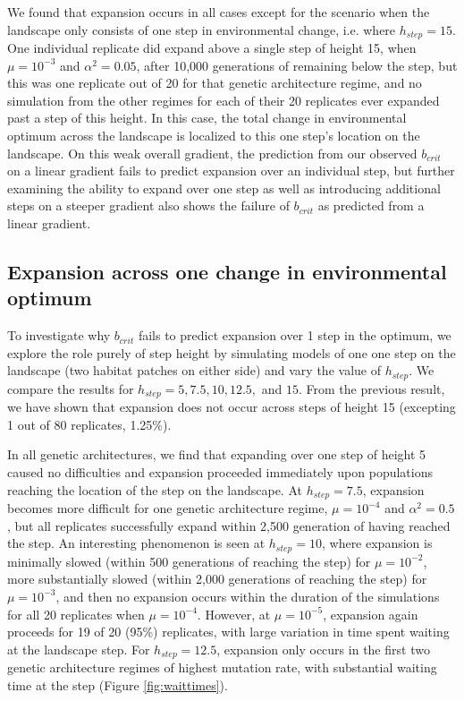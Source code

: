 We found that expansion occurs in all cases except for the scenario when the landscape only consists of one step in environmental change, i.e. where $h_{step} = 15$. One individual replicate did expand above a single step of height 15, when $\mu = 10^{-3}$ and $\alpha^2 = 0.05$, after 10,000 generations of remaining below the step, but this was one replicate out of 20 for that genetic architecture regime, and no simulation from the other regimes for each of their 20 replicates ever expanded past a step of this height. In this case, the total change in environmental optimum across the landscape is localized to this one step's location on the landscape. On this weak overall gradient, the prediction from our observed $b_{crit}$ on a linear gradient fails to predict expansion over an individual step, but further examining the ability to expand over one step as well as introducing additional steps on a steeper gradient also shows the failure of $b_{crit}$ as predicted from a linear gradient.


\subsection{Expansion across one change in environmental optimum}

To investigate why $b_{crit}$ fails to predict expansion over 1 step in the optimum, we explore the role purely of step height by simulating models of one one step on the landscape (two habitat patches on either side) and vary the value of $h_{step}$. We compare the results for $h_{step} = 5, 7.5, 10, 12.5,$ and $15$. From the previous result, we have shown that expansion does not occur across steps of height 15 (excepting 1 out of 80 replicates, 1.25\%).

In all genetic architectures, we find that expanding over one step of height 5 caused no difficulties and expansion proceeded immediately upon populations reaching the location of the step on the landscape. At $h_{step} = 7.5$, expansion becomes more difficult for one genetic architecture regime, $\mu = 10^{-4}$ and $\alpha^2 = 0.5$, but all replicates successfully expand within 2,500 generation of having reached the step. An interesting phenomenon is seen at $h_{step} = 10$, where expansion is minimally slowed (within 500 generations of reaching the step) for $\mu = 10^{-2}$, more substantially slowed (within 2,000 generations of reaching the step) for $\mu = 10^{-3}$, and then no expansion occurs within the duration of the simulations for all 20 replicates when $\mu = 10^{-4}$. However, at $\mu = 10^{-5}$, expansion again proceeds for 19 of 20 (95\%) replicates, with large variation in time spent waiting at the landscape step. For $h_{step} = 12.5$, expansion only occurs in the first two genetic architecture regimes of highest mutation rate, with substantial waiting time at the step (Figure \ref{fig:waittimes}).



